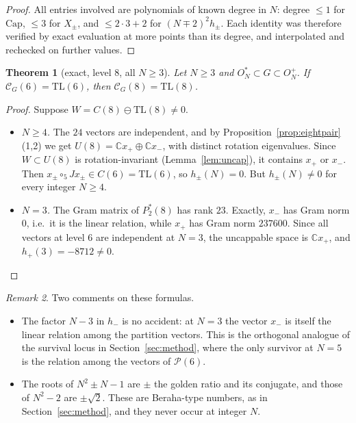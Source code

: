 \documentclass[11pt]{amsart}
\newtheorem{theorem}{Theorem}[section]
\theoremstyle{definition}
\theoremstyle{remark}
\newtheorem{remark}[theorem]{Remark}
\theoremstyle{plain}
\numberwithin{equation}{section}
\numberwithin{table}{section}
\newcommand{\C}{\mathbb C}
\newcommand{\TL}{\mathrm{TL}}
\begin{document}
\begin{proof}
All entries involved are polynomials of known degree in $N$: degree $\le1$ for $\mathrm{Cap}$, $\le3$ for $X_\pm$,
and $\le2\cdot3+2$ for $(N\mp2)^2h_\pm$. Each identity was therefore verified by exact evaluation at more points than
its degree, and interpolated and rechecked on further values.
\end{proof}

\begin{theorem}[exact, level $8$, all $N\ge3$]\label{thm:eight}
Let $N\ge3$ and $O_N^*\subset G\subset O_N^+$. If $\mathcal C_G(6)=\TL(6)$, then $\mathcal C_G(8)=\TL(8)$.
\end{theorem}

\begin{proof}
Suppose $W=C(8)\ominus\TL(8)\neq0$.
\begin{itemize}
\item \emph{$N\ge4$.} The $24$ vectors are independent, and by Proposition~\ref{prop:eightpair}(1,2) we get $U(8)=\C x_+\oplus\C x_-$,
with distinct rotation eigenvalues. Since $W\subset U(8)$ is rotation-invariant (Lemma~\ref{lem:uncap}), it contains $x_+$
or $x_-$. Then $x_\pm\circ_5Jx_\pm\in C(6)=\TL(6)$, so $h_\pm(N)=0$. But $h_\pm(N)\ne0$ for every integer $N\ge4$.
\item \emph{$N=3$.} The Gram matrix of $P_2^*(8)$ has rank $23$. Exactly, $x_-$ has Gram norm $0$, i.e.\ it is the
linear relation, while $x_+$ has Gram norm $237600$. Since all vectors at level $6$ are independent at $N=3$, the
uncappable space is $\C x_+$, and $h_+(3)=-8712\neq0$. \qedhere
\end{itemize}
\end{proof}

\begin{remark}
Two comments on these formulas.
\begin{itemize}
\item The factor $N-3$ in $h_-$ is no accident: at $N=3$ the vector $x_-$ is itself the linear relation among the
partition vectors. This is the orthogonal analogue of the survival locus in Section~\ref{sec:method}, where the only
survivor at $N=5$ is the relation among the vectors of $\mathcal P(6)$.
\item The roots of $N^2\pm N-1$ are $\pm$ the golden ratio and its conjugate, and those of $N^2-2$ are $\pm\sqrt2$. These are
Beraha-type numbers, as in Section~\ref{sec:method}, and they never occur at integer $N$.
\end{itemize}
\end{remark}
\end{document}
